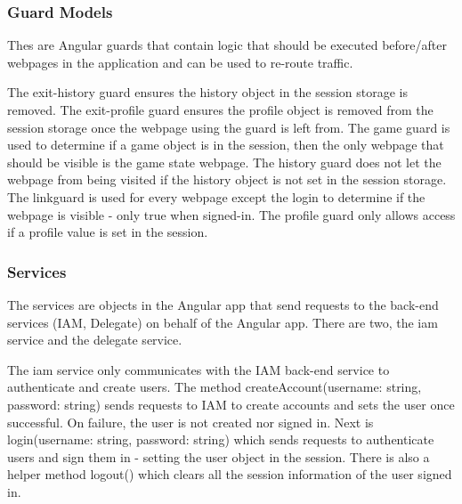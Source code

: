 \documentclass[12pt]{article}
\begin{document}
\subsubsection{Guard Models}
Thes are Angular guards that contain logic that should be executed before/after webpages in the application and can 
be used to re-route traffic.

The exit-history guard ensures the history object in the session storage is removed. The exit-profile guard ensures 
the profile object is removed from the session storage once the webpage using the guard is left from. The game 
guard is used to determine if a game object is in the session, then the only webpage that should be visible is the 
game state webpage. The history guard does not let the webpage from being visited if the history object is not 
set in the session storage. The linkguard is used for every webpage except the login to determine if the webpage is 
visible - only true when signed-in. The profile guard only allows access if a profile value is set in the session.


\subsubsection{Services}
The services are objects in the Angular app that send requests to the back-end services (IAM, Delegate) on behalf of 
the Angular app. There are two, the iam service and the delegate service. 

The iam service only communicates with the IAM back-end service to authenticate and create users. The method 
createAccount(username: string, password: string) sends requests to IAM to create accounts and sets the user once successful. 
On failure, the user is not created nor signed in. Next is login(username: string, password: string) which sends requests to 
authenticate users and sign them in - setting the user object in the session. There is also a helper method logout() which 
clears all the session information of the user signed in.
\end{document}
